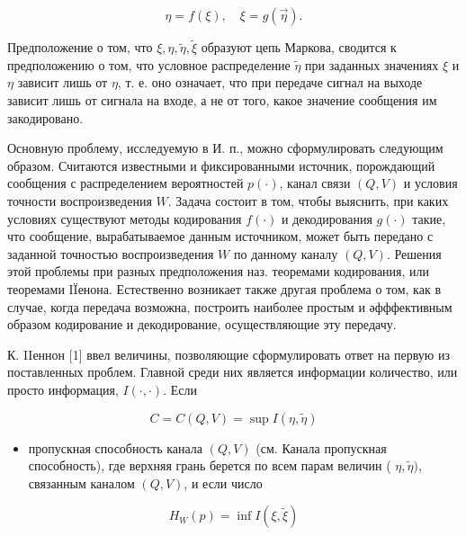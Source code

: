 \documentclass[10pt]{article}
\begin{document}
\[

\eta=f(\xi), \quad \xi=g(\vec{\eta}) .

\]



Предположение о том, что $\xi, \eta, \tilde{\eta}, \tilde{\xi}$ образуют цепь Маркова, сводится к предположению о том, что условное распределение $\tilde{\eta}$ при заданных значениях $\xi$ и $\eta$ зависит лишь от $\eta$, т. е. оно означает, что при передаче сигнал на выходе зависит лишь от сигнала на входе, а не от того, какое значение сообщения им закодировано.



Основную проблему, исследуемую в И. п., можно сформулировать следующим образом. Считаются известными и фиксированными источник, порождающий сообщения с распределением вероятностей $p(\cdot)$, канал связи $(Q, V)$ и условия точности воспроизведения $W$. Задача состоит в том, чтобы выяснить, при каких условиях существуют методы кодирования $f(\cdot)$ и декодирования $g(\cdot)$ такие, что сообщение, вырабатываемое данным источником, может быть передано с заданной точностью воспроизведения $W$ по данному каналу $(Q, V)$. Решения этой проблемы при разных предположения наз. теоремами кодирования, или теоремами IÏенона. Естественно возникает также другая проблема о том, как в случае, когда передача возможна, построить наиболее простым и әфффективным образом кодирование и декодирование, осуществляющие эту передачу.



К. IIеннон [1] ввел величины, позволяющие сформулировать ответ на первую из поставленных проблем. Главной среди них является информации количество, или просто информация, $I(\cdot, \cdot)$. Если



\[

C=C(Q, V)=\sup I(\eta, \tilde{\eta})

\]



\begin{itemize}

  \item пропускная способность канала $(Q, V)$ (см. Канала пропускная способность), где верхняя грань берется по всем парам величин ( $\eta, \tilde{\eta})$, связанным каналом $(Q, V)$, и если число

\end{itemize}



\[

H_{W}(p)=\inf I(\xi, \tilde{\xi})

\]
\end{document}
